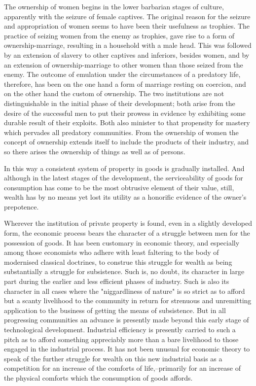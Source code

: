 \documentclass[12pt]{report}
\begin{document}
The ownership of women begins in the lower barbarian stages of culture,
apparently with the seizure of female captives. The original reason
for the seizure and appropriation of women seems to have been their
usefulness as trophies. The practice of seizing women from the enemy
as trophies, gave rise to a form of ownership-marriage, resulting in a
household with a male head. This was followed by an extension of slavery
to other captives and inferiors, besides women, and by an extension of
ownership-marriage to other women than those seized from the enemy.
The outcome of emulation under the circumstances of a predatory life,
therefore, has been on the one hand a form of marriage resting on
coercion, and on the other hand the custom of ownership. The two
institutions are not distinguishable in the initial phase of their
development; both arise from the desire of the successful men to put
their prowess in evidence by exhibiting some durable result of their
exploits. Both also minister to that propensity for mastery which
pervades all predatory communities. From the ownership of women the
concept of ownership extends itself to include the products of their
industry, and so there arises the ownership of things as well as of
persons.

In this way a consistent system of property in goods is gradually
installed. And although in the latest stages of the development,
the serviceability of goods for consumption has come to be the most
obtrusive element of their value, still, wealth has by no means yet lost
its utility as a honorific evidence of the owner's prepotence.

Wherever the institution of private property is found, even in a
slightly developed form, the economic process bears the character of a
struggle between men for the possession of goods. It has been customary
in economic theory, and especially among those economists who adhere
with least faltering to the body of modernised classical doctrines, to
construe this struggle for wealth as being substantially a struggle for
subsistence. Such is, no doubt, its character in large part during
the earlier and less efficient phases of industry. Such is also its
character in all cases where the "niggardliness of nature" is so strict
as to afford but a scanty livelihood to the community in return for
strenuous and unremitting application to the business of getting the
means of subsistence. But in all progressing communities an advance is
presently made beyond this early stage of technological development.
Industrial efficiency is presently carried to such a pitch as to afford
something appreciably more than a bare livelihood to those engaged in
the industrial process. It has not been unusual for economic theory to
speak of the further struggle for wealth on this new industrial basis as
a competition for an increase of the comforts of life,--primarily for
an increase of the physical comforts which the consumption of goods
affords.
\end{document}
